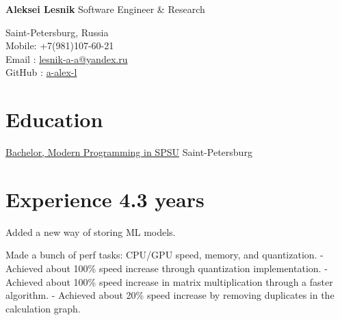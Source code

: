 \documentclass[12pt,a4paper]{moderncv}
\begin{document}

	\begin{minipage} {0.7\textwidth}
		\begin{flushleft}
			\huge \textbf{Aleksei Lesnik} 
			\newline
			\textcolor[gray]{0.4} {
			    \indent Software Engineer \& Research\\
			}
			\normalsize
		\end{flushleft}
	\end{minipage}
	\begin{minipage} {0.3\textwidth}
		\begin{flushright}
			\textcolor[gray]{0.4} {
				\indent Saint-Petersburg, Russia\\
				\indent Mobile: +7(981)107-60-21  \\
				\indent Email : \href{mailto:lesnik-a-a@yandex.ru} {lesnik-a-a@yandex.ru}\\ 
				\indent GitHub : \href{https://github.com/a-alex-l} {a-alex-l}\\  	
			}
		\end{flushright}
	\end{minipage}

    \section{Education}
    
            {\href {http://english.spbu.ru/education/undergraduate/bachelor/85-program-bac/2496-modern-programming}
                {Bachelor, Modern Programming in SPSU}}
            {}{}
            {Saint-Petersburg}
            {}

    \section{Experience 4.3 years}

            {Added a new way of storing ML models.}

            {Made a bunch of perf tasks: CPU/GPU speed, memory, and quantization.  \newline
             - Achieved about 100\% speed increase through quantization implementation. \newline
             - Achieved about 100\% speed increase in matrix multiplication through a faster algorithm. \newline
             - Achieved about 20\% speed increase by removing duplicates in the calculation graph.}
             
\end{document}
